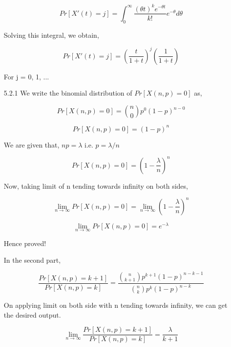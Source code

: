 \documentclass[a4paper,oneside,12pt]{report}
\begin{document}
\begin{enumerate}
	$$Pr[X'(t) = j] = \int_0^{\infty}\frac{(\theta t)^k e^{-\theta t}}{k!} e^{-\theta} d\theta$$

	Solving this integral, we obtain,
	
	$$Pr[X'(t) = j] = \left(\frac{t}{1 + t}\right)^j \left(\frac{1}{1 + t}\right)$$
	
	For j = 0, 1, ...
	
	\item[5.2.1] We write the binomial distribution of $Pr[X(n, p) = 0]$ as,
	
	$$ Pr[X(n, p) = 0] = {n \choose 0} p^0 (1-p)^{n - 0} $$
	
	$$ Pr[X(n, p) = 0] = (1-p)^n $$
	
	We are given that, $np = \lambda$ i.e. $p = \lambda/n$
	
	$$ Pr[X(n, p) = 0] = \left(1-\frac{\lambda}{n}\right)^n $$

	Now, taking limit of n tending towards infinity on both sides,
	
	$$ \lim_{n\to\infty} Pr[X(n, p) = 0] = \lim_{n\to\infty} \left(1-\frac{\lambda}{n}\right)^n $$
	
	$$ \lim_{n\to\infty} Pr[X(n, p) = 0] = e^{-\lambda}$$
	
	Hence proved!
	
	In the second part,
	
	$$\frac{Pr[X(n, p) = k + 1]}{Pr[X(n, p) = k]} = \frac{{n \choose k + 1} p^{k + 1} (1 - p)^{n - k - 1}}{{n \choose k} p^{k} (1 - p)^{n - k}}$$
	
	On applying limit on both side with n tending towards infinity, we can get the desired output.
	
	$$\lim_{n\to\infty} \frac{Pr[X(n, p) = k + 1]}{Pr[X(n, p) = k]} = \frac{\lambda}{k + 1}$$
	
\end{enumerate}
\end{document}
